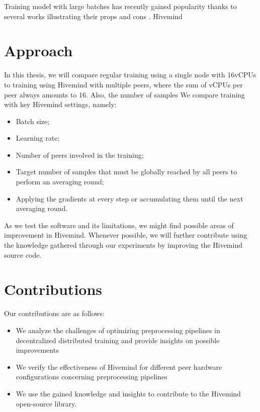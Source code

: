 Training model with large batches has recently gained popularity thanks to several works illustrating their props and cons \cite{DBLP:journals/corr/KeskarMNST16, you2017scaling, DBLP:journals/corr/abs-1904-00962}.
Hivemind

\section{Approach}

In this thesis, we will compare regular training using a single node with 16vCPUs to training using Hivemind with multiple peers, where the sum of vCPUs per peer always amounts to 16.
Also, the number of samples
We compare training with key Hivemind settings, namely:
\begin{itemize}
    \item Batch size;
    \item Learning rate;
    \item Number of peers involved in the training;
    \item Target number of samples that must be globally reached by all peers to perform an averaging round;
    \item Applying the gradients at every step or accumulating them until the next averaging round.
\end{itemize}

As we test the software and its limitations, we might find possible areas of improvement in Hivemind.
Whenever possible, we will further contribute using the knowledge gathered through our experiments by improving the Hivemind \cite{hivemind} source code.

\section{Contributions}

Our contributions are as follows:
\begin{itemize}
    \item We analyze the challenges of optimizing preprocessing pipelines in decentralized distributed training and provide insights on possible improvements
    \item We verify the effectiveness of Hivemind for different peer hardware configurations concerning preprocessing pipelines
    \item We use the gained knowledge and insights to contribute to the Hivemind open-source library.
\end{itemize}
